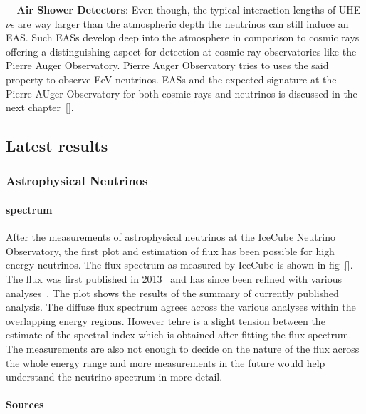 \begin{description}
  \item $-$ \textbf{Air Shower Detectors}: Even though, the typical interaction lengths of UHE$\nu$s are way larger than the atmospheric depth the neutrinos can still induce an EAS. Such EASs develop deep into the atmosphere in comparison to cosmic rays offering a distinguishing aspect for detection at cosmic ray observatories like the Pierre Auger Observatory. Pierre Auger Observatory tries to uses the said property to observe EeV neutrinos. EASs and the expected signature at the Pierre AUger Observatory for both cosmic rays and neutrinos is discussed in the next chapter~\ref{}.   

  \end{description}

\subsection{Latest results}
  \label{subsec:Nuresults}
  
\subsubsection*{Astrophysical Neutrinos}
  
  \paragraph*{spectrum}
    \label{subsubsec:Nuspectrum}
  After the measurements of astrophysical neutrinos at the IceCube Neutrino Observatory, the first plot and estimation of flux has been possible for high energy neutrinos. The flux spectrum as measured by IceCube is shown in fig~\ref{}. The flux was first published in 2013~\cite{} and has since been refined with various analyses~\cite{}. The plot shows the results of the summary of currently published analysis. The diffuse flux spectrum agrees across the various analyses within the overlapping energy regions. However tehre is a slight tension between the estimate of the spectral index which is obtained after fitting the flux spectrum. The measurements are also not enough to decide on the nature of the flux across the whole energy range and more measurements in the future would help understand the neutrino spectrum in more detail. 

  \paragraph*{Sources}
    \label{subsubsec:Nusources}
  
